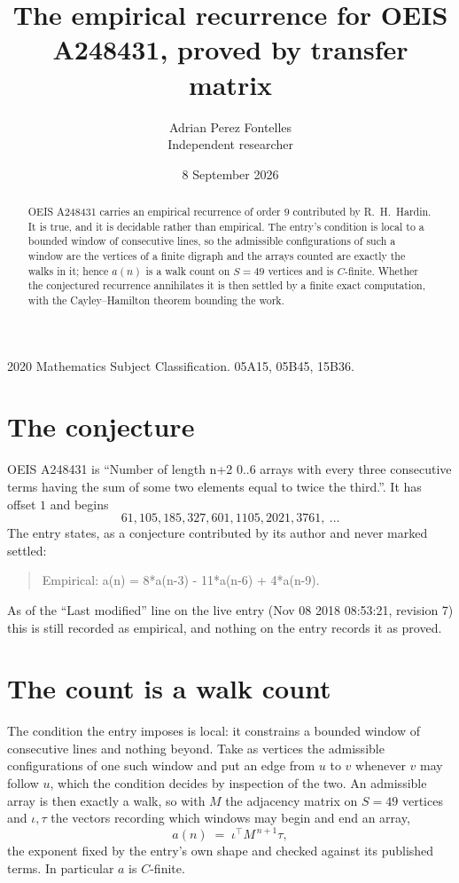\documentclass[11pt,a4paper]{article}
\title{The empirical recurrence for OEIS A248431, proved by transfer matrix}
\author{Adrian Perez Fontelles\\ \small Independent researcher}
\date{8 September 2026}
\theoremstyle{plain}
\theoremstyle{definition}
\begin{document}
\maketitle

\begin{abstract}
OEIS A248431 carries an empirical recurrence of order $9$ contributed by R.~H.~Hardin. It is
true, and it is decidable rather than empirical. The entry's condition is local to a bounded window of consecutive lines, so
the admissible configurations of such a window are the vertices of a finite digraph and the
arrays counted are exactly the walks in it; hence $a(n)$ is a walk count on $S=49$ vertices
and is $C$-finite. Whether the conjectured recurrence annihilates it is then settled by a
finite exact computation, with the Cayley--Hamilton theorem bounding the work.
\end{abstract}

\noindent\small 2020 Mathematics Subject Classification. 05A15, 05B45, 15B36.\normalsize

\section{The conjecture}

OEIS A248431 is ``Number of length n+2 0..6 arrays with every three consecutive terms having the sum of some two elements equal to twice the third.''. It has offset $1$ and begins
\[
61, 105, 185, 327, 601, 1105, 2021, 3761,\ \dots
\]
The entry states, as a conjecture contributed by its author and never marked settled:
\begin{quote}
Empirical: a(n) = 8*a(n-3) - 11*a(n-6) + 4*a(n-9).
\end{quote}
As of the ``Last modified'' line on the live entry (Nov 08 2018 08:53:21, revision 7) this is still
recorded as empirical, and nothing on the entry records it as proved.

\section{The count is a walk count}

The condition the entry imposes is local: it constrains a bounded window of consecutive lines and nothing beyond. Take as
vertices the admissible configurations of one such window and put an edge from $u$ to $v$
whenever $v$ may follow $u$, which the condition decides by inspection of the two. An
admissible array is then exactly a walk, so with $M$ the adjacency matrix on $S=49$ vertices
and $\iota,\tau$ the vectors recording which windows may begin and end an array,
\[
a(n)\;=\;\iota^{\!\top}M^{\,n+1}\tau ,
\]
the exponent fixed by the entry's own shape and checked against its published terms. In
particular $a$ is $C$-finite.
\end{document}
